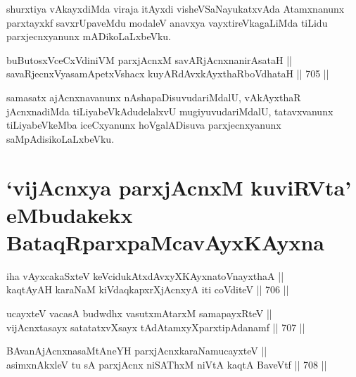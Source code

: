 \begin{artha} 
shurxtiya vAkayxdiMda viraja itAyxdi visheVSaNayukatxvAda Atamxnanunx 
parxtayxkf savxrUpaveMdu modaleV anavxya vayxtireVkagaLiMda tiLidu 
parxjecnxyanunx mADikoLaLxbeVku.
\end{artha}


\begin{shl}
buButosxVceCxVdiniVM parxjAcnxM savARjAcnxnanirAsataH || \\
savaRjecnxVyasamApetxVshacx kuyARdAvxkAyxthaRboVdhataH \hfill || 705 ||  
\end{shl}

\begin{artha} 
samasatx ajAcnxnavanunx nAshapaDisuvudariMdalU, vAkAyxthaR 
jAcnxnadiMda tiLiyabeVkAdudelalxvU mugiyuvudariMdalU, tatavxvanunx 
tiLiyabeVkeMba iceCxyanunx hoVgalADisuva parxjecnxyanunx 
saMpAdisikoLaLxbeVku.
\end{artha}


\section*{`vijAcnxya parxjAcnxM kuviRVta' eMbudakekx 
BataqRparxpaMcavAyxKAyxna}

\begin{shl}
iha vAyxcakaSxteV keVcidukAtxdAvxyXKAyxnatoV\s nayxthaA || \\
kaqtAyAH karaNaM kiVdaqkapxrXjAcnxyA iti coVditeV \hfill || 706 ||  
\end{shl}
				
\begin{shl}
ucayxteV vacasA budwdhx vasutxmAtarxM samapayxRteV || \\
vijAcnxtasayx satatatxvXsayx tAdAtamxyXparxtipAdanamf \hfill || 707 ||  
\end{shl}
				
\begin{shl}
BAvanAjAcnxnasaMtAneYH parxjAcnxkaraNamucayxteV ||  \\
asimxnAkxleV tu sA parxjAcnx niSAThxM niVtA kaqtA BaveVtf \hfill || 708 ||  
\end{shl}

